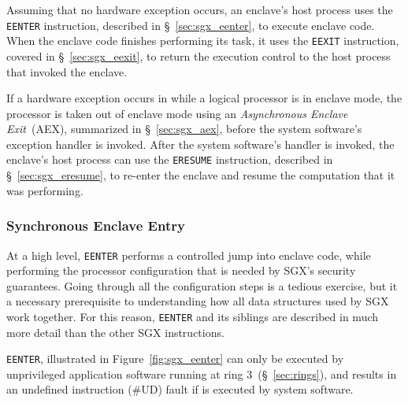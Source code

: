 Assuming that no hardware exception occurs, an enclave's host process uses the
\texttt{EENTER} instruction, described in \S~\ref{sec:sgx_eenter}, to execute
enclave code. When the enclave code finishes performing its task, it uses the
\texttt{EEXIT} instruction, covered in \S~\ref{sec:sgx_eexit}, to return the
execution control to the host process that invoked the enclave.

If a hardware exception occurs in while a logical processor is in enclave mode,
the processor is taken out of enclave mode using an
\textit{Asynchronous Enclave Exit}~(AEX), summarized in \S~\ref{sec:sgx_aex},
before the system software's exception handler is invoked. After the system
software's handler is invoked, the enclave's host process can use the
\texttt{ERESUME} instruction, described in \S~\ref{sec:sgx_eresume}, to
re-enter the enclave and resume the computation that it was performing.


\subsubsection{Synchronous Enclave Entry}
\label{sec:sgx_enclave_mode}
\label{sec:sgx_eenter}

At a high level, \texttt{EENTER} performs a controlled jump into enclave code,
while performing the processor configuration that is needed by SGX's security
guarantees. Going through all the configuration steps is a tedious exercise,
but it a necessary prerequisite to understanding how all data structures used
by SGX work together. For this reason, \texttt{EENTER} and its siblings are
described in much more detail than the other SGX instructions.


\texttt{EENTER}, illustrated in Figure~\ref{fig:sgx_eenter} can only be
executed by unprivileged application software running at ring
3~(\S~\ref{sec:rings}), and results in an undefined instruction (\#UD) fault if
is executed by system software.

